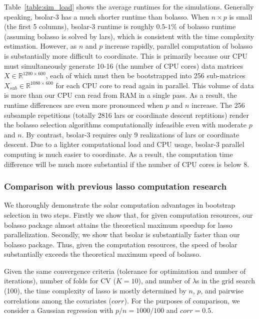 \documentclass[11pt,review,authoryear]{elsarticle}
\begin{document}
Table~\ref{table:sim_load} shows the average runtimes for the simulations. Generally speaking, bsolar-3 has a much shorter runtime than bolasso. When $n \times p$ is small (the first 5 columns), bsolar-3 runtime is roughly $0.5$-$1\%$ of bolasso runtime (assuming bolasso is solved by lars), which is consistent with the time complexity estimation. However, as $n$ and $p$ increase rapidly, parallel computation of bolasso is substantially more difficult to coordinate. This is primarily because our CPU must simultaneously generate 10-16 (the number of CPU cores) data matrices $X\in \mathbb{R}^{1200 \times 600}$, each of which must then be bootstrapped into 256 sub-matrices $X_{sub}\in \mathbb{R}^{1080 \times 600}$ for each CPU core to read again in parallel. This volume of data is more than our CPU can read from RAM in a single pass. As a result, the runtime differences are even more pronounced when $p$ and $n$ increase. The 256 subsample repetitions (totally 2816 lars or coordinate descent reptitions) render the bolasso selection algorithms computationally infeasible even with moderate $p$ and $n$. By contrast, bsolar-3 requires only 9 realizations of lars or coordinate descent. Due to a lighter computational load and CPU usage, bsolar-3 parallel computing is much easier to coordinate. As a result, the computation time difference will be much more substantial if the number of CPU cores is below $8$.

\subsubsection{Comparison with previous lasso computation research}

We thoroughly demonstrate the solar computation advantages in bootstrap selection in two steps. Firstly we show that, for given computation resources, our bolasso package almost attains the theoretical maximum speedup for lasso parallelization. Secondly, we show that bsolar is substantially faster than our bolasso package. Thus, given the computation resources, the speed of bsolar substantially exceeds the theoretical maximum speed of bolasso.

Given the same convergence criteria (tolerance for optimization and number of iterations), number of folds for CV ($K=10$), and number of $\lambda$s in the grid search (100), the time complexity of lasso is mostly determined by $n$, $p$, and pairwise correlations among the covariates ($corr$). For the purposes of comparison, we consider a Gaussian regression with $p/n=1000/100$ and $corr=0.5$.
\end{document}
